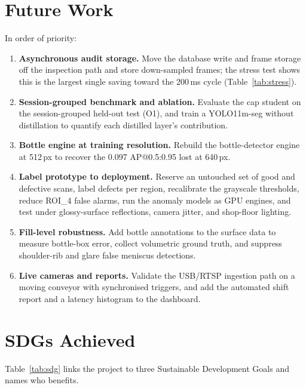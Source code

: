 \section{Future Work}
\label{sec:future-work}
In order of priority:
\begin{enumerate}
    \item \textbf{Asynchronous audit storage.} Move the database write and frame storage off the inspection path and store down-sampled frames; the stress test shows this is the largest single saving toward the 200\,ms cycle (Table~\ref{tab:stress}).
    \item \textbf{Session-grouped benchmark and ablation.} Evaluate the cap student on the session-grouped held-out test (O1), and train a YOLO11m-seg without distillation to quantify each distilled layer's contribution.
    \item \textbf{Bottle engine at training resolution.} Rebuild the bottle-detector engine at 512\,px to recover the 0.097 AP@0.5:0.95 lost at 640\,px.
    \item \textbf{Label prototype to deployment.} Reserve an untouched set of good and defective scans, label defects per region, recalibrate the grayscale thresholds, reduce ROI\_4 false alarms, run the anomaly models as GPU engines, and test under glossy-surface reflections, camera jitter, and shop-floor lighting.
    \item \textbf{Fill-level robustness.} Add bottle annotations to the surface data to measure bottle-box error, collect volumetric ground truth, and suppress shoulder-rib and glare false meniscus detections.
    \item \textbf{Live cameras and reports.} Validate the USB/RTSP ingestion path on a moving conveyor with synchronised triggers, and add the automated shift report and a latency histogram to the dashboard.
\end{enumerate}

\section{SDGs Achieved}
\label{sec:sdgs-achieved}

Table~\ref{tab:sdg} links the project to three Sustainable Development Goals and names who benefits.

